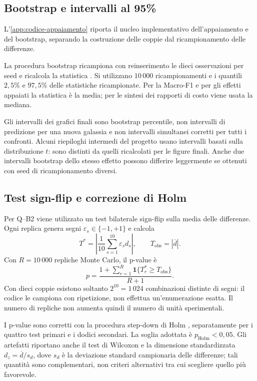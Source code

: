 \subsection{Bootstrap e intervalli al 95\%}

L'\cref{app:codice-appaiamento} riporta il nucleo implementativo
dell'appaiamento e del bootstrap, separando la costruzione delle
coppie dal ricampionamento delle differenze.

La procedura bootstrap ricampiona con reinserimento le dieci
osservazioni per seed e ricalcola la statistica
\cite{efron1979bootstrap}. Si utilizzano \(10\,000\) ricampionamenti
e i quantili \(2{,}5\%\) e \(97{,}5\%\) delle statistiche ricampionate.
Per la Macro-F1 e per gli effetti appaiati la statistica è la media;
per le sintesi dei rapporti di costo viene usata la mediana.

Gli intervalli dei grafici finali sono bootstrap percentile,
non intervalli di predizione per una nuova galassia e non intervalli
simultanei corretti per tutti i confronti. Alcuni riepiloghi intermedi
del progetto usano intervalli basati sulla distribuzione \(t\):
sono distinti da quelli ricalcolati per le figure finali.
Anche due intervalli bootstrap dello stesso effetto possono differire
leggermente se ottenuti con seed di ricampionamento diversi.

\subsection{Test sign-flip e correzione di Holm}

Per Q--B2 viene utilizzato un test bilaterale sign-flip sulla media
delle differenze. Ogni replica genera segni
\(\varepsilon_s\in\{-1,+1\}\) e calcola
\[
  T^*=\left|\frac{1}{10}\sum_{s=1}^{10}\varepsilon_s d_s\right|,
  \qquad T_{\mathrm{obs}}=|\overline d|.
\]
Con \(R=10\,000\) repliche Monte Carlo, il p-value è
\begin{equation}
  p=\frac{1+\sum_{r=1}^{R}\mathbf 1\{T_r^*\ge T_{\mathrm{obs}}\}}{R+1}.
\end{equation}
Con dieci coppie esistono soltanto \(2^{10}=1\,024\) combinazioni
distinte di segni: il codice le campiona con ripetizione, non effettua
un'enumerazione esatta. Il numero di repliche non aumenta quindi il
numero di unità sperimentali.

I p-value sono corretti con la procedura step-down di Holm
\cite{holm1979multiple}, separatamente per i quattro test primari
e i dodici secondari. La soglia adottata è
\(p_{\mathrm{Holm}}<0{,}05\). Gli artefatti riportano anche il test
di Wilcoxon e la dimensione standardizzata
\(d_z=\overline d/s_d\), dove \(s_d\) è la deviazione standard
campionaria delle differenze; tali quantità sono complementari,
non criteri alternativi tra cui scegliere quello più favorevole.


